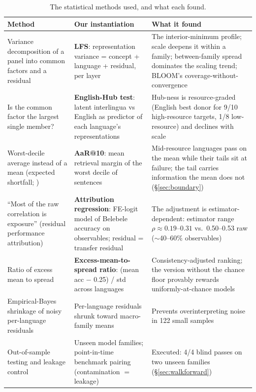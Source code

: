\documentclass[11pt,a4paper]{article}
\begin{document}
\begin{table}[H]
\centering
\small
\caption{The statistical methods used, and what each found.}
\begin{tabular}{p{3.6cm}p{4.6cm}p{6.2cm}}
\toprule
Method & Our instantiation & What it found \\
\midrule
Variance decomposition of a panel into common factors and a residual \citep{ross1976apt,fama1993factors} &
\textbf{LFS}: representation variance = concept + language + residual, per layer &
The interior-minimum profile; scale deepens it within a family; between-family
spread dominates the scaling trend; BLOOM's coverage-without-convergence \\[2pt]
Is the common factor the largest single member? &
\textbf{English-Hub test}: latent interlingua vs English as predictor of each
language's representations &
Hub-ness is resource-graded (English best donor for 9/10 high-resource targets,
1/8 low-resource) and declines with scale \\[2pt]
Worst-decile average instead of a mean (expected shortfall; \citealp{artzner1999coherent,rockafellar2000cvar}) &
\textbf{AaR@10}: mean retrieval margin of the worst decile of sentences &
Mid-resource languages pass on the mean while their tails sit at failure;
the tail carries information the mean does not (\S\ref{sec:boundary}) \\[2pt]
``Most of the raw correlation is exposure'' (residual performance attribution) &
\textbf{Attribution regression}: FE-logit model of Belebele accuracy on
observables; residual = transfer residual &
The adjustment is estimator-dependent: estimator range $\rho \approx 0.19$--$0.31$
vs.\ 0.50--0.53 raw ($\sim$40--60\% observables) \\[2pt]
Ratio of excess mean to spread &
\textbf{Excess-mean-to-spread ratio}: (mean acc $-$ 0.25) / std across languages &
Consistency-adjusted ranking; the version without the chance floor provably rewards
uniformly-at-chance models \\[2pt]
Empirical-Bayes shrinkage of noisy per-language residuals &
Per-language residuals shrunk toward macro-family means &
Prevents overinterpreting noise in 122 small samples \\[2pt]
Out-of-sample testing and leakage control &
Unseen model families; point-in-time benchmark pairing (contamination
$=$ leakage) &
Executed: 4/4 blind passes on two unseen families (\S\ref{sec:walkforward}) \\
\bottomrule
\end{tabular}
\label{tab:transfer}
\end{table}
\end{document}
